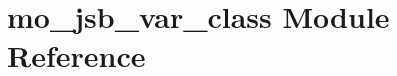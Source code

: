 \hypertarget{namespacemo__jsb__var__class}{}\section{mo\+\_\+jsb\+\_\+var\+\_\+class Module Reference}
\label{namespacemo__jsb__var__class}
